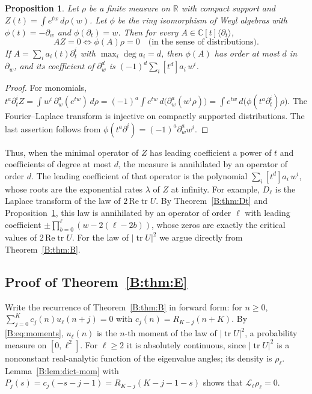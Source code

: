 \documentclass[11pt,a4paper]{article}
\newtheorem{proposition}[theorem]{Proposition}
\theoremstyle{definition}
\theoremstyle{remark}
\newcommand{\C}{\mathbb C}
\newcommand{\R}{\mathbb R}
\DeclareMathOperator{\tr}{tr}
\numberwithin{equation}{section}
\begin{document}
\begin{proposition}\label{B:prop:transport}
Let $\rho$ be a finite measure on $\R$ with compact support and $Z(t)=\int e^{tw}\,d\rho(w)$. Let $\phi$ be the ring isomorphism of Weyl algebras with $\phi(t)=-\partial_w$ and $\phi(\partial_t)=w$. Then for every $A\in\C[t]\langle\partial_t\rangle$,
\[
AZ=0\iff\phi(A)\rho=0\quad\text{(in the sense of distributions)}.
\]
If $A=\sum_ia_i(t)\partial_t^i$ with $\max_i\deg a_i=d$, then $\phi(A)$ has order at most $d$ in $\partial_w$, and its coefficient of $\partial_w^d$ is $(-1)^d\sum_i[t^d]a_i\,w^i$.
\end{proposition}

\begin{proof}
For monomials, $t^a\partial_t^iZ=\int w^i\,\partial_w^a(e^{tw})\,d\rho=(-1)^a\int e^{tw}\,d\bigl(\partial_w^a(w^i\rho)\bigr)=\int e^{tw}\,d\bigl(\phi(t^a\partial_t^i)\rho\bigr)$. The Fourier--Laplace transform is injective on compactly supported distributions. The last assertion follows from $\phi(t^a\partial^i)=(-1)^a\partial_w^aw^i$.
\end{proof}

Thus, when the minimal operator of $Z$ has leading coefficient a power of $t$ and coefficients of degree at most $d$, the measure is annihilated by an operator of order $d$. The leading coefficient of that operator is the polynomial $\sum_i[t^d]a_i\,w^i$, whose roots are the exponential rates $\lambda$ of $Z$ at infinity. For example, $D_\ell$ is the Laplace transform of the law of $2\,\mathrm{Re}\tr U$. By Theorem~\ref{B:thm:Dt} and Proposition~\ref{B:prop:transport}, this law is annihilated by an operator of order $\ell$ with leading coefficient $\pm\prod_{b=0}^{\ell}(w-2(\ell-2b))$, whose zeros are exactly the critical values of $2\,\mathrm{Re}\tr U$. For the law of $|\tr U|^2$ we argue directly from Theorem~\ref{B:thm:B}.

\subsection{Proof of Theorem~\ref{B:thm:E}}
Write the recurrence of Theorem~\ref{B:thm:B} in forward form: for $n\ge0$, $\sum_{j=0}^{K}c_j(n)u_\ell(n+j)=0$ with $c_j(n)=R_{K-j}(n+K)$. By \eqref{B:eq:moments}, $u_\ell(n)$ is the $n$-th moment of the law of $|\tr U|^2$, a probability measure on $[0,\ell^2]$. For $\ell\ge2$ it is absolutely continuous, since $|\tr U|^2$ is a nonconstant real-analytic function of the eigenvalue angles; its density is $\rho_\ell$. Lemma~\ref{B:lem:dict-mom} with $P_j(s)=c_j(-s-j-1)=R_{K-j}(K-j-1-s)$ shows that $\mathcal L_\ell\rho_\ell=0$.
\end{document}
